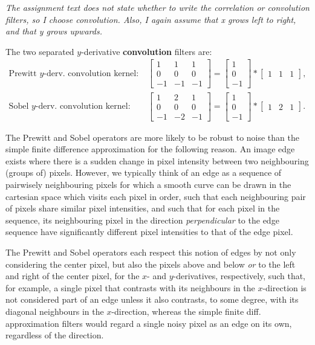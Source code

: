\emph{The assignment text does not state whether to write the correlation or
convolution filters, so I choose convolution. Also, I again assume that x grows
left to right, and that y grows upwards.}

The two separated $y$-derivative \textbf{convolution} filters are:
\begin{align*}
  \text{Prewitt }y\text{-derv. convolution kernel}: &\quad
  \begin{bmatrix}
    1 & 1 & 1\\
    0 & 0 & 0\\
    -1 & -1 & -1 
  \end{bmatrix} = 
  \begin{bmatrix}
    1\\0\\-1
  \end{bmatrix} * 
  \begin{bmatrix}
    1 & 1 & 1
  \end{bmatrix},\\[12pt]
  \text{Sobel }y\text{-derv. convolution kernel}: &\quad
  \begin{bmatrix}
    1 & 2 & 1\\
    0 & 0 & 0\\
    -1 & -2 & -1 
  \end{bmatrix} = 
  \begin{bmatrix}
    1\\0\\-1
  \end{bmatrix} * 
  \begin{bmatrix}
    1 & 2 & 1
  \end{bmatrix}.
\end{align*}

The Prewitt and Sobel operators are more likely to be robust to noise than the
simple finite difference approximation for the following reason. An image edge
exists where there is a sudden change in pixel intensity between two
neighbouring (groups of) pixels. However, we typically think of an edge as a
sequence of pairwisely neighbouring pixels for which a smooth curve can be drawn
in the cartesian space which visits each pixel in order, such that each
neighbouring pair of pixels share similar pixel intensities, and such that for
each pixel in the sequence, its neighbouring pixel in the direction
\emph{perpendicular} to the edge sequence have significantly different pixel
intensities to that of the edge pixel.

The Prewitt and Sobel operators each respect this notion of edges by not only
considering the center pixel, but also the pixels above and below \emph{or} to
the left and right of the center pixel, for the $x$- and $y$-derivatives,
respectively, such that, for example, a single pixel that contrasts with its
neighbours in the $x$-direction is not considered part of an edge unless it also
contrasts, to some degree, with its diagonal neighbours in the $x$-direction,
whereas the simple finite diff. approximation filters would regard a single
noisy pixel as an edge on its own, regardless of the direction.
